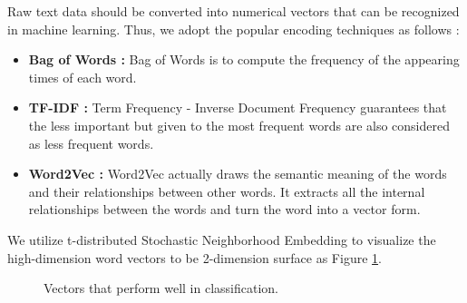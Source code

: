 \documentclass[12pt]{article}%
\begin{document}
    Raw text data should be converted into numerical vectors that can be recognized in machine learning. Thus, we adopt the popular encoding techniques as follows :

\begin{itemize} 
	\item  \textbf{Bag of Words \cite{BOW, BOW2}:} Bag of Words is to compute the frequency of the appearing times of each word. 
	\item  \textbf{TF-IDF \cite{TF} :} Term Frequency - Inverse Document Frequency guarantees that the less important but given to the most frequent words are also considered as less frequent words.
	
	\item  \textbf{Word2Vec \cite{word,word2,word3}:} Word2Vec actually draws the semantic meaning of the words and their relationships between other words. It extracts all the internal relationships between the words and turn the word into a vector form.

\end{itemize}
We utilize t-distributed Stochastic Neighborhood Embedding\cite{t} to visualize the high-dimension word vectors to be 2-dimension surface as Figure \ref{fig}.
\begin{figure}[H]
	\centering
	\caption{ Vectors that perform well in classification.}
	\label{fig}
\end{figure}
\end{document}
